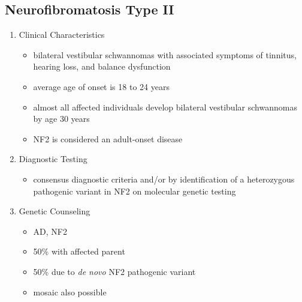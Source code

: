 \documentclass[12pt]{scrartcl}
\begin{document}
\subsection{Neurofibromatosis Type II}
\label{sec:orgfbe87c9}
\begin{enumerate}
\item Clinical Characteristics
\label{sec:orgb146b3a}
\begin{itemize}
\item bilateral vestibular schwannomas with associated symptoms of tinnitus, hearing loss, and balance dysfunction
\item average age of onset is 18 to 24 years
\item almost all affected individuals develop bilateral vestibular
schwannomas by age 30 years
\item NF2 is considered an adult-onset disease
\end{itemize}
\item Diagnostic Testing
\label{sec:org252f810}
\begin{itemize}
\item consensus diagnostic criteria and/or by identification of a
heterozygous pathogenic variant in NF2 on molecular genetic testing
\end{itemize}

\item Genetic Counseling
\label{sec:org9af630e}
\begin{itemize}
\item AD, NF2
\item 50\% with affected parent
\item 50\% due to \emph{de novo} NF2 pathogenic variant
\item mosaic also possible
\end{itemize}
\end{enumerate}
\end{document}
